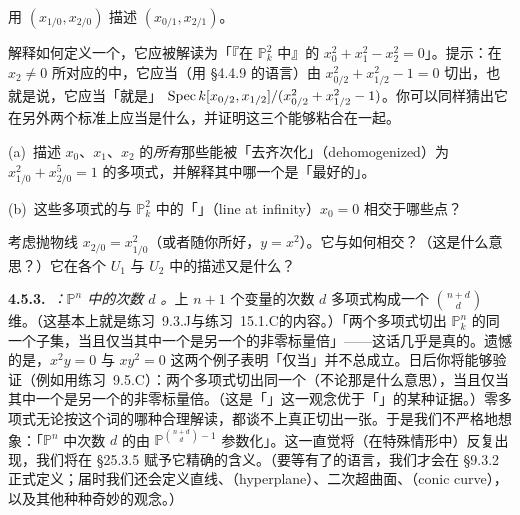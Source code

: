 \begin{exercise}\label{ex:proj-coordinate-change}
用 $(x_{1/0},x_{2/0})$ 描述 $(x_{0/1},x_{2/1})$。
\end{exercise}

\begin{exercise}\label{ex:conic-via-standard-charts}
解释如何定义一个\trScheme，它应被解读为「『在 $\mathbb{P}^2_k$ 中』的 $x_0^2+x_1^2-x_2^2=0$」。提示：在 $x_2\neq0$ 所对应的\trAffine\trOpenSubset{}中，它应当（用 \S4.4.9 的语言）由 $x_{0/2}^2+x_{1/2}^2-1=0$ 切出，也就是说，它应当「就是」\trScheme{} $\operatorname{Spec} k[x_{0/2},x_{1/2}]/(x_{0/2}^2+x_{1/2}^2-1)$。你可以同样猜出它在另外两个标准\trOpenSet{}上应当是什么，并证明这三个\trScheme{}能够粘合在一起。
\end{exercise}

\begin{exercise}\label{ex:dehomogenization}
(a)~描述 $x_0$、$x_1$、$x_2$ 的\emph{所有}那些能被「去齐次化」（dehomogenized）为 $x_{1/0}^2+x_{2/0}^5=1$ 的\trHomogeneous{}多项式，并解释其中哪一个是「最好的」。

(b)~这些多项式的\trVanishingSet{}与 $\mathbb{P}^2_k$ 中的「\trLineAtInfinity」（line at infinity）$x_0=0$ 相交于哪些点？
\end{exercise}

\begin{exercise}\label{ex:parabola-at-infinity}
考虑抛物线 $x_{2/0}=x_{1/0}^2$（或者随你所好，$y=x^2$）。它与\trLineAtInfinity{}如何相交？（这是什么意思？）它在各个\trCoordinatePatch{} $U_1$ 与 $U_2$ 中的描述又是什么？
\end{exercise}

\textbf{4.5.3.}\ \emph{\trhRemark{}：$\mathbb{P}^n$ 中的次数 $d$ \trHypersurface。}\quad \trField{}上 $n+1$ 个变量的次数 $d$ \trHomogeneous{}多项式构成一个 $\binom{n+d}{d}$ 维\trVectorSpace。（这基本上就是\mbox{练习~9.3.J}与\mbox{练习~15.1.C}的内容。）「两个多项式切出 $\mathbb{P}^n_k$ 的同一个子集，当且仅当其中一个是另一个的非零标量倍」——这话几乎是真的。遗憾的是，$x^2y=0$ 与 $xy^2=0$ 这两个例子表明「仅当」并不总成立。日后你将能够验证（例如用\mbox{练习~9.5.C}）：两个多项式切出同一个\emph{\trClosedSubscheme}（不论那是什么意思），当且仅当其中一个是另一个的非零标量倍。（这是「\trClosedSubscheme」这一观念优于「\trClosedSubset」的某种证据。）零多项式无论按这个词的哪种合理解读，都谈不上真正切出一张\trHypersurface。于是我们不严格地想象：「$\mathbb{P}^n$ 中次数 $d$ 的\trHypersurface{}由 $\mathbb{P}^{\binom{n+d}{d}-1}$ 参数化」。这一直觉将（在特殊情形中）反复出现，我们将在 \S25.3.5 赋予它精确的含义。（要等有了\trClosedSubscheme{}的语言，我们才会在 \S9.3.2 正式定义\trHypersurface；届时我们还会定义直线、\trHyperplane{}（hyperplane）、二次超曲面、\trConic{}（conic curve），以及其他种种奇妙的观念。）

